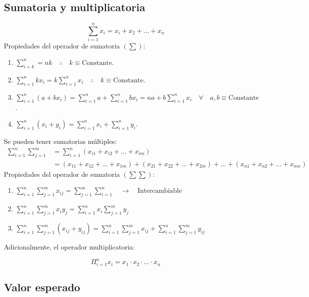 \documentclass[
]{book}
\providecommand{\tightlist}{%
  \setlength{\itemsep}{0pt}\setlength{\parskip}{0pt}}
\begin{document}
\hypertarget{sumatoria-y-multiplicatoria}{%
\subsection{Sumatoria y multiplicatoria}\label{sumatoria-y-multiplicatoria}}

\[
\sum_{i=1}^n x_i = x_i + x_2 + \ldots + x_n
\]
Propiedades del operador de sumatoria \((\sum)\):

\begin{enumerate}
\def\labelenumi{\arabic{enumi}.}
\tightlist
\item
  \(\sum_{i=k}^n = nk \quad \therefore \quad k \equiv \text{Constante}\).
\item
  \(\sum_{i=1}^n k x_i = k\sum_{i=1}^nx_i \quad \therefore \quad k \equiv \text{Constante}\).
\item
  \(\sum_{i=1}^n (a+bx_i) = \sum_{i=1}^n a + \sum_{i=1}^n bx_i = na + b \sum_{i=1}^n x_i \quad \forall \quad a,b \equiv \text{Constante}\).
\item
  \(\sum_{i=1}^n (x_i + y_i) = \sum_{i=1}^nx_i + \sum_{i=1}^n y_i\).
\end{enumerate}

Se pueden tener sumatorias múltiples:
\[
\begin{aligned}
\sum_{i=1}^n\sum_{j=1}^m &= \sum_{i=1}^n (x_{i1} + x_{i2} + \ldots + x_{im}) \\
&= (x_{11} + x_{12} + \ldots + x_{1m}) + (x_{21} + x_{22} + \ldots + x_{2m})  + \ldots + (x_{n1} + x_{n2} + \ldots + x_{nm})
\end{aligned}
\]
Propiedades del operador de sumatoria \((\sum \sum)\):

\begin{enumerate}
\def\labelenumi{\arabic{enumi}.}
\tightlist
\item
  \(\sum_{i=1}^n\sum_{j=1}^m x_{ij} = \sum_{j=1}^m\sum_{i=1}^n \quad \rightarrow \quad \text{Intercambiable}\)
\item
  \(\sum_{i=1}^n\sum_{j=1}^m x_i y_j = \sum_{i=1}^n x_i \sum_{j=1}^m y_j\)
\item
  \(\sum_{i=1}^n\sum_{j=1}^m (x_{ij} + y_{ij}) = \sum_{i=1}^n\sum_{j=1}^m x_{ij} + \sum_{i=1}^n\sum_{j=1}^m y_{ij}\)
\end{enumerate}

Adicionalmente, el operador multiplicatoria:

\[
\Pi_{i=1}^n x_i = x_1\cdot x_2 \cdot \ldots \cdot x_n
\]

\hypertarget{valor-esperado}{%
\subsection{Valor esperado}\label{valor-esperado}}
\end{document}

